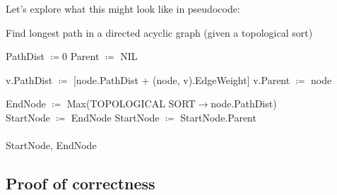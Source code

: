 \documentclass[conference]{styles/acmsiggraph}
\newcommand{\?}{\stackrel{?}{=}}
\begin{document}
Let's explore what this might look like in pseudocode:

\begin{algorithm}
	\caption{Find longest path in a directed acyclic graph (given a topological sort)}
    \label{alg:longpath}
	\begin{algorithmic}
		\State PathDist $\coloneq 0$
		\State Parent $\coloneq$ NIL
		\EndFor
		
		 
            		\State v.PathDist $\coloneq$ [node.PathDist + (node, v).EdgeWeight]
            		\State v.Parent $\coloneq$ node
        		\EndIf
        	\EndFor

		\EndFor
		
		\State EndNode $\coloneq$ Max(TOPOLOGICAL SORT$\to$node.PathDist)  \\
		\State StartNode $\coloneq$ EndNode
		    \State StartNode $\coloneq$ StartNode.Parent
		\EndWhile\\
		\\
		\Return StartNode, EndNode
	\end{algorithmic} 
\end{algorithm} 

\FloatBarrier

\subsection{Proof of correctness}
\end{document}
